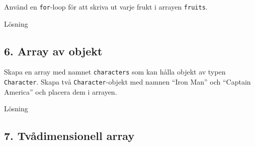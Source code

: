 Använd en \texttt{for}-loop för att skriva ut varje frukt i arrayen
\texttt{fruits}.

Lösning

\hypertarget{cb4}{}
\begin{Shaded}
\begin{Highlighting}[]
 \OperatorTok{(}\OperatorTok{=} \OperatorTok{;}\OperatorTok{\textless{}}\OperatorTok{;}\OperatorTok{++)} \OperatorTok{\{}
    \OperatorTok{(}\OperatorTok{[}\OperatorTok{]);}
\OperatorTok{\}}
\end{Highlighting}
\end{Shaded}

\hypertarget{array-av-objekt}{%
\subsection{6. Array av objekt}\label{array-av-objekt}}

Skapa en array med namnet \texttt{characters} som kan hålla objekt av
typen \texttt{Character}. Skapa två \texttt{Character}-objekt med namnen
``Iron Man'' och ``Captain America'' och placera dem i arrayen.

Lösning

\hypertarget{cb5}{}
\begin{Shaded}
\begin{Highlighting}[]
\OperatorTok{[]}\OperatorTok{=}  \OperatorTok{[}\OperatorTok{];}
\OperatorTok{[}\OperatorTok{]} \OperatorTok{=}  \OperatorTok{(}\OperatorTok{);}
\OperatorTok{[}\OperatorTok{]} \OperatorTok{=}  \OperatorTok{(}\OperatorTok{);}
\end{Highlighting}
\end{Shaded}

\hypertarget{tvuxe5dimensionell-array}{%
\subsection{7. Tvådimensionell array}\label{tvuxe5dimensionell-array}}

